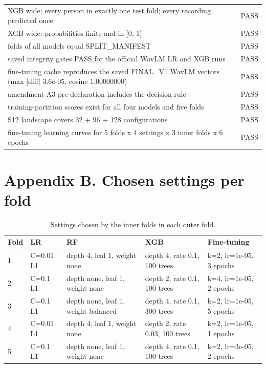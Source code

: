 \documentclass[11pt,a4paper]{article}
\begin{document}
\begin{table}[H]
\begin{adjustbox}{max width=\linewidth}
\begin{tabular}{p{13.3cm}l}
XGB wide: every person in exactly one test fold; every recording predicted once & PASS\\
XGB wide: probabilities finite and in [0, 1] & PASS\\
folds of all models equal SPLIT\_MANIFEST & PASS\\
saved integrity gates PASS for the official WavLM LR and XGB runs & PASS\\
fine-tuning cache reproduces the saved FINAL\_V1 WavLM vectors (max |diff| 3.6e-05, cosine 1.00000000) & PASS\\
amendment A3 pre-declaration includes the decision rule & PASS\\
training-partition scores exist for all four models and five folds & PASS\\
S12 landscape covers 32 + 96 + 128 configurations & PASS\\
fine-tuning learning curves for 5 folds x 4 settings x 3 inner folds x 6 epochs & PASS\\
\bottomrule
\end{tabular}\end{adjustbox}\end{table}
\section*{Appendix B. Chosen settings per fold}
\begin{table}[H]\centering\footnotesize\renewcommand{\arraystretch}{1.15}
\caption{Settings chosen by the inner folds in each outer fold.}
\begin{adjustbox}{max width=\linewidth}\begin{tabular}{lllll}
\toprule
\textbf{Fold} & \textbf{LR} & \textbf{RF} & \textbf{XGB} & \textbf{Fine-tuning}\\
\midrule
1 & C=0.01 L1 & depth 4, leaf 1, weight none & depth 4, rate 0.1, 100 trees & k=2, lr=1e-05, 3 epochs\\
2 & C=0.1 L1 & depth none, leaf 1, weight none & depth 2, rate 0.1, 100 trees & k=4, lr=1e-05, 2 epochs\\
3 & C=0.1 L1 & depth none, leaf 1, weight balanced & depth 4, rate 0.1, 300 trees & k=2, lr=1e-05, 5 epochs\\
4 & C=0.01 L1 & depth 4, leaf 1, weight none & depth 2, rate 0.03, 100 trees & k=2, lr=1e-05, 1 epochs\\
5 & C=0.1 L1 & depth none, leaf 1, weight none & depth 4, rate 0.1, 100 trees & k=2, lr=3e-05, 2 epochs\\
\bottomrule
\end{tabular}\end{adjustbox}\end{table}
\end{document}
